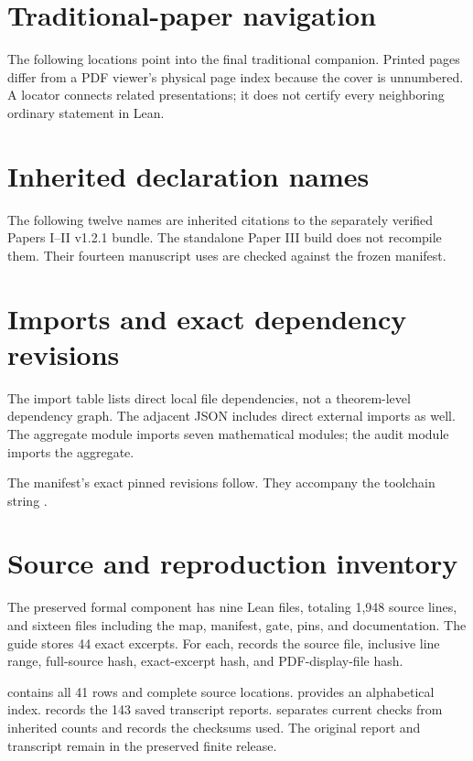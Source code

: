 \section{Traditional-paper navigation}\label{app:crosswalk}
The following locations point into the final traditional companion. Printed pages differ from a PDF viewer's physical page index because the cover is unnumbered. A locator connects related presentations; it does not certify every neighboring ordinary statement in Lean.

\section{Inherited declaration names}\label{app:inherited}
The following twelve names are inherited citations to the separately verified Papers I--II v1.2.1 bundle. The standalone Paper III build does not recompile them. Their fourteen manuscript uses are checked against the frozen manifest.

\clearpage
\section{Imports and exact dependency revisions}
The import table lists direct local file dependencies, not a theorem-level dependency graph. The adjacent JSON includes direct external imports as well. The aggregate module imports seven mathematical modules; the audit module imports the aggregate.

The manifest's exact pinned revisions follow. They accompany the toolchain string .

\clearpage
\section{Source and reproduction inventory}
The preserved formal component has nine Lean files, totaling 1,948 source lines, and sixteen files including the map, manifest, gate, pins, and documentation. The guide stores 44 exact excerpts. For each,  records the source file, inclusive line range, full-source hash, exact-excerpt hash, and PDF-display-file hash.

 contains all 41 rows and complete source locations.  provides an alphabetical index.  records the 143 saved transcript reports.  separates current checks from inherited counts and records the checksums used. The original report and transcript remain in the preserved finite release.

